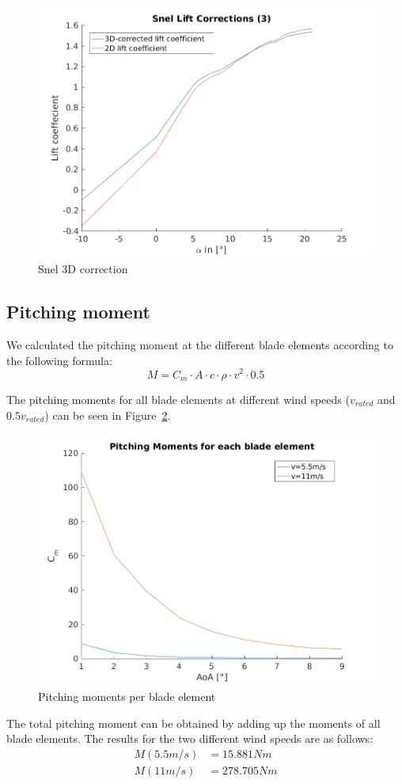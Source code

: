 \documentclass[10pt]{article}
\begin{document}
\begin{figure}[H]
\centering
\includegraphics[width=0.8\linewidth]{../CIP_2/Figures/snel_correction_3.png}
\caption{Snel 3D correction}
\label{fig:snel}
\end{figure}

\subsection{Pitching moment}
We calculated the pitching moment at the different blade elements according to the following formula:
\begin{equation*}
M= C_m \cdot A \cdot c \cdot \rho \cdot v^2 \cdot 0.5
\end{equation*}

The pitching moments for all blade elements at different wind speeds ($v_{rated}$ and $0.5v_{rated}$) can be seen in Figure~\ref{fig:pitchingperbe}.
\begin{figure}[H]
\centering
\includegraphics[width=0.8\linewidth]{../CIP_2/Figures/pitchingperbe.png}
\caption{Pitching moments per blade element}
\label{fig:pitchingperbe}
\end{figure}
The total pitching moment can be obtained by adding up the moments of all blade elements. The results for the two different wind speeds  are as follows:
\begin{align*}
M(5.5m/s) &= 15.881 Nm\\
M(11m/s) &= 278.705 Nm
\end{align*}
\end{document}
